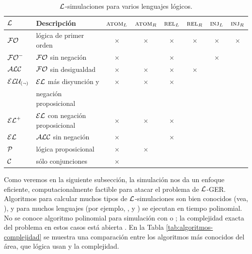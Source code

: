 \begin{table}[t]

\begin{tabular}{|l|l|cccccc|}
\hline
  $\mathcal{L}$ & Descripci\'on &$\textsc{atom}_L$ & $\textsc{atom}_R$ & $\textsc{rel}_L$ & $\textsc{rel}_R$ & $\textsc{inj}_L\space$ & $\textsc{inj}_R\space$ \\
  \hline
  $\mathcal{FO}$ & l\'ogica de primer orden & $\times$ & $\times$ & $\times$ & $\times$ & $\times$ & $\times$ \\ \hline
  ${\mathcal{FO}^-}$ & $\mathcal{FO}$ sin negaci\'on & $\times$ & & $\times$ && $\times$ & \\ \hline 
  $\mathcal{ALC}$   & $\mathcal{FO}$ sin desigualdad & $\times$ & $\times$ & $\times$ & $\times$&& \\ \hline
 
	$\mathcal{ELU_{(\neg)} }$ & $\mathcal{EL}$ m\'as disyunci\'on y  & $\times$ & $\times$ &  $\times$ & & & \\ 
	&negaci\'on proposicional&&&&&&\\ \hline
  ${\mathcal{EL}^+}$ & $\mathcal{EL}$ con negaci\'on proposicional & $\times$ & $\times$ &  $\times$ & & & \\ \hline
	$\mathcal{EL}$   & $\mathcal{ALC}$ sin negaci\'on & $\times$ & &  $\times$ & & & \\ \hline
	$\mathcal{P}$ & l\'ogica proposicional& $\times$ & $\times$ & & & & \\ \hline
	$\mathcal{C}$ & s\'olo conjunciones& $\times$ &  &  & & & \\ 
	
\hline	
\end{tabular}

\caption{$\mathcal{L}$-simulaciones para varios lenguajes l\'ogicos.}\label{tab:simuls}
\end{table}

Como veremos en la siguiente subsecci\'on, la simulaci\'on nos da un
enfoque eficiente, computacionalmente factible para atacar el problema de $\mathcal{L}$-GER. Algoritmos para calcular muchos tipos de $\mathcal{L}$-simulaciones son
bien conocidos (vea, \cite{hopc:algo71,areces08,HHK95,dovier04:_effic_algor_for_comput_bisim_equiv}), y para muchos
lenguajes (por ejemplo, \ALC, \ELAN y \EL) se ejecutan en tiempo polinomial. No se conoce algoritmo polinomial 
 para simulaci\'on con \FOL o \EPFOL; la complejidad exacta del problema en estos casos est\'a abierta \cite{gare:comp79}.
En la Tabla \ref{tab:algoritmos-complejidad} se muestra una comparaci\'on entre los algoritmos m\'as conocidos del \'area, que l\'ogica usan y la complejidad.


